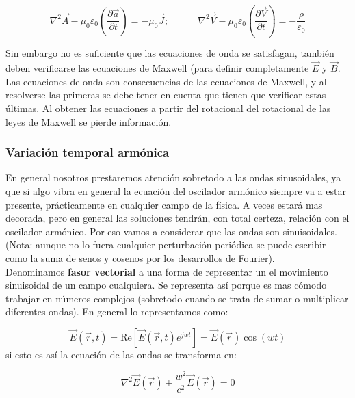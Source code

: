 \documentclass[12pt,a4paper]{article}
\newcommand{\parentesis}[1]{\left( #1  \right)}
\newcommand{\parciales}[2]{\frac{\partial #1}{\partial #2}}
\newcommand{\pparciales}[2]{\parentesis{\parciales{#1}{#2}}}
\newcommand{\tquad}{\quad \quad \quad}
\begin{document}
\begin{equation}
\nabla^2 \vec{A} -  \mu_0 \varepsilon_0 \pparciales{\vec{a}}{t}  = - \mu_0 \vec{J}; \tquad 
\nabla^2 \vec{V} -  \mu_0 \varepsilon_0 \pparciales{\vec{V}}{t}  = - \dfrac{\rho}{\varepsilon_0}
\end{equation} 

Sin embargo no es suficiente que las ecuaciones de onda se satisfagan, también deben verificarse las ecuaciones de Maxwell (para definir completamente $\vec{E}$ y $\vec{B}$. Las ecuaciones de onda son consecuencias de las ecuaciones de Maxwell, y al resolverse las primeras se debe tener en cuenta que tienen que verificar estas últimas. Al obtener las ecuaciones a partir del rotacional del rotacional de las leyes de Maxwell se pierde información.







\subsubsection{Variación temporal armónica}
En general nosotros prestaremos atención sobretodo a las ondas sinusoidales, ya que si algo vibra en general la ecuación del oscilador armónico siempre va a estar presente, prácticamente en cualquier campo de la física. A veces estará mas decorada, pero en general las soluciones tendrán, con total certeza, relación con el oscilador armónico. Por eso vamos a considerar que las ondas son sinuisoidales. (Nota: aunque no lo fuera cualquier perturbación periódica se puede escribir como la suma de senos y cosenos por los desarrollos de Fourier).\\

Denominamos \textbf{fasor vectorial} a una forma de representar un el movimiento sinuisoidal de un campo cualquiera. Se representa así porque es mas cómodo trabajar en números complejos (sobretodo cuando se trata de sumar o multiplicar diferentes ondas). En general lo representamos como:

\begin{equation}
\vec{E} (\vec{r},t) = \mathrm{Re} \left[ \vec{E} (\vec{r},t) e^{jwt} \right] = \vec{E} (\vec{r}) \cos (wt)
\end{equation}
si esto es así la ecuación de las ondas se transforma en:

\begin{equation}
\nabla^2 \vec{E} (\vec{r}) + \dfrac{w^2}{c^2} \vec{E} (\vec{r}) = 0
\end{equation}
\end{document}
